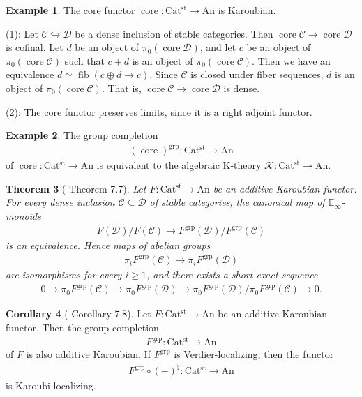 \documentclass[a4paper,dvipdfmx,11pt,reqno]{amsart}
\DeclareMathOperator{\fib}{fib}
\newcommand{\C}{\mathcal{C}}
\newcommand{\D}{\mathcal{D}}
\newcommand{\K}{\mathcal{K}}
\DeclareMathOperator{\core}{core}
\DeclareMathOperator{\grp}{grp}
\newcommand{\An}{\mathrm{An}}
\newcommand{\Catst}{\mathrm{Cat^{st}}}
\newcommand{\Einf}{\mathbb{E}_{\infty}}
\newtheorem{theorem}{Theorem}[section]
\theoremstyle{definition}
\newtheorem{corollary}[theorem]{Corollary}
\newtheorem{example}[theorem]{Example}
\begin{document}
\begin{example} \label{Ber.rem.5.50}
  The core functor $\core : \Catst \to \An$ is Karoubian.

  (1):
  Let $\C \hookrightarrow \D$ be a dense inclusion of stable categories.
  Then $\core\C \to \core\D$ is cofinal.
  Let $d$ be an object of $\pi_0(\core\D)$, and let $c$ be an object of $\pi_0(\core\C)$ such that $c+d$ is an object of $\pi_0(\core\C)$.
  Then we have an equivalence $d \simeq \fib(c \oplus d \to c)$.
  Since $\C$ is closed under fiber sequences, $d$ is an object of $\pi_0(\core\C)$.
  That is, $\core\C \to \core\D$ is dense.

  (2):
  The core functor preserves limits, since it is a right adjoint functor.
\end{example}

\begin{example} \label{eg.group_completion_of_core}
  The group completion 
  \begin{align*}
    (\core)^{\grp} : \Catst \to \An
  \end{align*}
  of $\core : \Catst \to \An$ is equivalent to the algebraic K-theory $\K : \Catst \to \An$.
\end{example}

\begin{theorem}[\cite{HLS23} Theorem 7.7] \label{HLS23.thrm.7.7}
  Let $F : \Catst \to \An$ be an additive Karoubian functor.
  For every dense inclusion $\C \subseteq \D$ of stable categories, the canonical map of $\Einf$-monoids
  \begin{align*}
    F(\D)/F(\C) \to F^{\grp}(\D)/F^{\grp}(\C)
  \end{align*}
  is an equivalence.
  Hence maps of abelian groups
  \begin{align*}
    \pi_iF^{\grp}(\C) \to \pi_iF^{\grp}(\D)
  \end{align*}
  are isomorphisms for every $i \geq 1$, and there exists a short exact sequence 
  \begin{align*}
    0 \to \pi_0F^{\grp}(\C) \to \pi_0F^{\grp}(\D) \to \pi_0F^{\grp}(\D)/\pi_0F^{\grp}(\C) \to 0.
  \end{align*}
\end{theorem}

\begin{corollary}[\cite{HLS23} Corollary 7.8] \label{HLS23.cor.7.8}
  Let $F : \Catst \to \An$ be an additive Karoubian functor.
  Then the group completion 
  \begin{align*}
    F^{\grp} : \Catst \to \An
  \end{align*}
  of $F$ is also additive Karoubian.
  If $F^{\grp}$ is Verdier-localizing, then the functor
  \begin{align*}
    F^{\grp} \circ (-)^{\natural} : \Catst \to \An
  \end{align*}
  is Karoubi-localizing.
\end{corollary}
\end{document}
